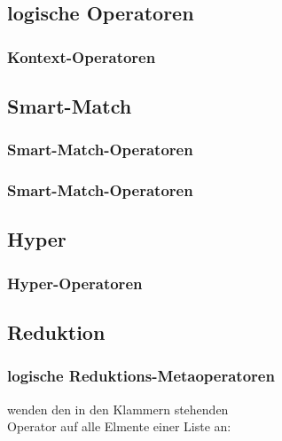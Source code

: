 





\subsection{logische Operatoren}
\begin{frame}
	\frametitle{Kontext-Operatoren}
	
\end{frame}



\subsection{Smart-Match}
\begin{frame}
	\frametitle{Smart-Match-Operatoren}
	
\end{frame}
\begin{frame}
	\frametitle{Smart-Match-Operatoren}
	
\end{frame}



 
\subsection{Hyper}
\begin{frame}
	\frametitle{Hyper-Operatoren}
	
\end{frame}


\subsection{Reduktion}
\begin{frame}
	\frametitle{logische Reduktions-Metaoperatoren}
	\textellipsis wenden den in den Klammern stehenden \\
	Operator auf alle Elmente einer Liste an:
	
\end{frame}



